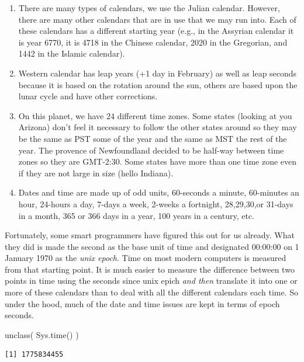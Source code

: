 \documentclass[
  letterpaper,
]{book}
\newenvironment{Shaded}{\begin{snugshade}}{\end{snugshade}}
\newcommand{\FunctionTok}[1]{\textcolor[rgb]{0.28,0.35,0.67}{#1}}
\newcommand{\NormalTok}[1]{\textcolor[rgb]{0.00,0.23,0.31}{#1}}
\providecommand{\tightlist}{%
  \setlength{\itemsep}{0pt}\setlength{\parskip}{0pt}}
\begin{document}
\begin{enumerate}
\def\labelenumi{\arabic{enumi}.}
\tightlist
\item
  There are many types of calendars, we use the Julian calendar.
  However, there are many other calendars that are in use that we may
  run into. Each of these calendars has a different starting year (e.g.,
  in the Assyrian calendar it is year 6770, it is 4718 in the Chinese
  calendar, 2020 in the Gregorian, and 1442 in the Islamic calendar).
\item
  Western calendar has leap years (+1 day in February) as well as leap
  seconds because it is based on the rotation around the sun, others are
  based upon the lunar cycle and have other corrections.
\item
  On this planet, we have 24 different time zones. Some states (looking
  at you Arizona) don't feel it necessary to follow the other states
  around so they may be the same as PST some of the year and the same as
  MST the rest of the year. The provence of Newfoundland decided to be
  half-way between time zones so they are GMT-2:30. Some states have
  more than one time zone even if they are not large in size (hello
  Indiana).
\item
  Dates and time are made up of odd units, 60-seconds a minute,
  60-minutes an hour, 24-hours a day, 7-days a week, 2-weeks a
  fortnight, 28,29,30,or 31-days in a month, 365 or 366 days in a year,
  100 years in a century, etc.
\end{enumerate}

Fortunately, some smart programmers have figured this out for us
already. What they did is made the second as the base unit of time and
designated 00:00:00 on 1 January 1970 as the \emph{unix epoch}. Time on
most modern computers is measured from that starting point. It is much
easier to measure the difference between two points in time using the
seconds since unix epich \emph{and then} translate it into one or more
of these calendars than to deal with all the different calendars each
time. So under the hood, much of the date and time issues are kept in
terms of epoch seconds.

\begin{Shaded}
\begin{Highlighting}[]
\FunctionTok{unclass}\NormalTok{( }\FunctionTok{Sys.time}\NormalTok{() )}
\end{Highlighting}
\end{Shaded}

\begin{verbatim}
[1] 1775834455
\end{verbatim}
\end{document}
